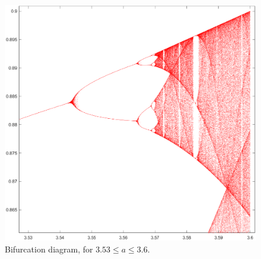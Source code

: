 \documentclass[twocolumn,amsmath,amssymb,aps]{revtex4}
\begin{document}
\begin{figure}[!htb]
	\centering
	\includegraphics[scale=0.3]{logistic_4_top_branch_1}
	\caption{Bifurcation diagram, for $3.53 \leq a \leq 3.6$.}
	\label{fig:logistic_4}
\end{figure}
\end{document}
